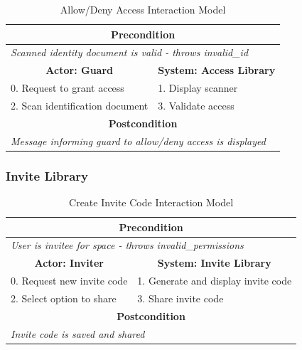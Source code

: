 \begin{table}[H]
\centering
\begin{tabular}{|l|l|}
\hline
\multicolumn{2}{|c|}{\textbf{Precondition}}                                              \\ \hline
\multicolumn{2}{|l|}{\textit{Scanned identity document is valid - throws invalid\_id}}   \\ \hline
\multicolumn{1}{|c|}{\textbf{Actor: Guard}} & \multicolumn{1}{c|}{\textbf{System: Access Library}} \\ \hline
0. Request to grant access          & 1. Display scanner                                 \\ \hline
2. Scan identification document     & 3. Validate access    \\ \hline
\multicolumn{2}{|c|}{\textbf{Postcondition}}                                             \\ \hline
\multicolumn{2}{|l|}{\textit{Message informing guard to allow/deny access is displayed}} \\ \hline
\end{tabular}
\caption{Allow/Deny Access Interaction Model}
\label{tab:access_interaction}
\end{table}

\subsubsection{Invite Library}

\begin{table}[H]
\centering
\begin{tabular}{|l|l|}
\hline
\multicolumn{2}{|c|}{\textbf{Precondition}}                    \\ \hline
\multicolumn{2}{|l|}{\textit{User is invitee for space - throws invalid\_permissions}}             \\ \hline
\multicolumn{1}{|c|}{\textbf{Actor: Inviter}} & \multicolumn{1}{c|}{\textbf{System: Invite Library}} \\ \hline
0. Request new invite code        & 1. Generate and display invite code            \\ \hline
2. Select option to share       & 3. Share invite code    \\ \hline
\multicolumn{2}{|c|}{\textbf{Postcondition}}                   \\ \hline
\multicolumn{2}{|l|}{\textit{Invite code is saved and shared}} \\ \hline
\end{tabular}
\caption{Create Invite Code Interaction Model}
\label{tab:create_invite_interaction}
\end{table}

